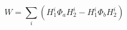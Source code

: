 \begin{equation}
W=\sum_i \left(H^i_1 \Phi_a H^i_2- H^i_1 \Phi_b H^i_2 \right)
\label{EqFtermSuperpotential}
\end{equation}

